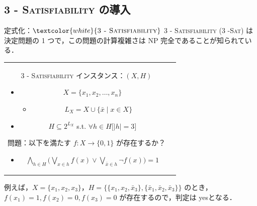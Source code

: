 \documentclass[dvipdfmx]{beamer}
\begin{document}
\subsection{\textsc{ 3 - Satisfiability} の導入}
\begin{frame}{定式化：${\textcolor{white}{\mbox {\sc 3 - Satisfiability}}}$}
  \textsc{3 - Satisfiability (3 -Sat) } は決定問題の 1 つで，この問題の計算複雑さは NP  完全であることが知られている．
  \begin{tabular}{cc}
    \begin{minipage}[]{0.7\hsize}
      \begin{block}{\textsc{3 - Satisfiability}}
        インスタンス：$(X,H)$
        \begin{itemize}
          \item $X=\{x_1,x_2,\dots ,x_n\}$
          \begin{itemize}
            \item $L_X = X \cup \{\bar x \mid x \in X\}$
          \end{itemize}
          \item $H \subseteq 2^{L_X}$ s.t. $\forall h \in H \big[|h| = 3\big]$
        \end{itemize}
        問題：以下を満たす $f : X \to \{0,1\}$ が存在するか？
        \begin{itemize}
          \item $\displaystyle \bigwedge_{h \in H} \bigg(\bigvee_{x \in h}f(x) \lor \bigvee_{\bar x \in h}\lnot f(x) \bigg) = 1$
        \end{itemize}
      \end{block}
    \end{minipage}
    \begin{minipage}[c]{0.3\hsize}
    \end{minipage}
    \vspace{3mm}
  \end{tabular}

  例えば，$X = \{x_1,x_2,x_3\}$，$H = \big\{ \{x_1, x_2, \bar x_3\}, \{\bar x_1, \bar x_2,\bar x_3\}\big\}$ のとき，
  $f(x_1) = 1, f(x_2) = 0, f(x_3) = 0$ が存在するので，判定は yesとなる．
\end{frame}
\end{document}
